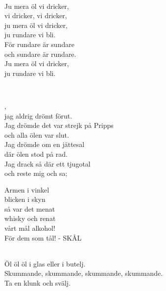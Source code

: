 
 \\       

\songtext{}
Ju mera öl vi dricker, \\ 
vi dricker, vi dricker, \\ 
ju mera öl vi dricker, \\ 
ju rundare vi bli. \\ 
För rundare är sundare \\ 
och sundare är rundare. \\ 
Ju mera öl vi dricker, \\ 
ju rundare vi bli. 

\newpage

 \\       

,  \\
jag aldrig drömt förut.  \\
Jag drömde det var strejk på Pripps  \\
och alla ölen var slut.  \\
Jag drömde om en jättesal  \\
där ölen stod på rad.  \\
Jag drack så där ett tjugotal  \\
och reste mig och sa; 
 
Armen i vinkel  \\
blicken i skyn  \\
så var det menat  \\
whisky och renat  \\
vårt mål alkohol!  \\
För dem som tål! - SKÅL  \\


 \\       

\songtext{}Öl öl öl i glas eller i butelj. \\
Skummande, skummande, skummande, skummande. \\
Ta en klunk och svälj. \\

